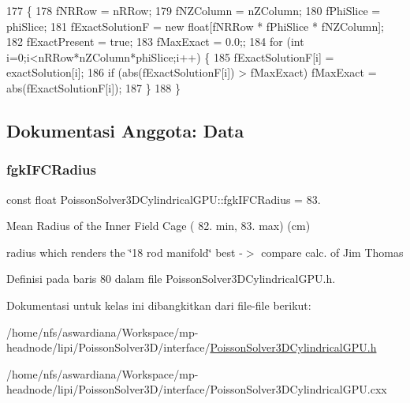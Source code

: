\begin{DoxyCode}
177                                                                                                            
         \{
178     fNRRow = nRRow;
179     fNZColumn = nZColumn;
180     fPhiSlice = phiSlice;
181     fExactSolutionF = \textcolor{keyword}{new} \textcolor{keywordtype}{float}[fNRRow * fPhiSlice * fNZColumn];
182     fExactPresent = \textcolor{keyword}{true};
183     fMaxExact = 0.0;;
184     \textcolor{keywordflow}{for} (\textcolor{keywordtype}{int} i=0;i<nRRow*nZColumn*phiSlice;i++) \{
185         fExactSolutionF[i] = exactSolution[i];
186         \textcolor{keywordflow}{if} (abs(fExactSolutionF[i]) > fMaxExact) fMaxExact = abs(fExactSolutionF[i]); 
187     \}
188 \}
\end{DoxyCode}


\subsection{Dokumentasi Anggota\+: Data}
\hypertarget{classPoissonSolver3DCylindricalGPU_a6688ba03a837d4919001cd0aa14ef80e}{}\label{classPoissonSolver3DCylindricalGPU_a6688ba03a837d4919001cd0aa14ef80e} 
\subsubsection{\texorpdfstring{fgk\+I\+F\+C\+Radius}{fgkIFCRadius}}
{\footnotesize\ttfamily const float Poisson\+Solver3\+D\+Cylindrical\+G\+P\+U\+::fgk\+I\+F\+C\+Radius = 83.\hspace{0.3cm}{\ttfamily [static]}}



Mean Radius of the Inner Field Cage ( 82. min, 83. max) (cm) 

radius which renders the \char`\"{}18 rod manifold\char`\"{} best -\/$>$ compare calc. of Jim Thomas 

Definisi pada baris 80 dalam file Poisson\+Solver3\+D\+Cylindrical\+G\+P\+U.\+h.



Dokumentasi untuk kelas ini dibangkitkan dari file-\/file berikut\+:\begin{DoxyCompactItemize}
\item 
/home/nfs/aswardiana/\+Workspace/mp-\/headnode/lipi/\+Poisson\+Solver3\+D/interface/\hyperlink{PoissonSolver3DCylindricalGPU_8h}{Poisson\+Solver3\+D\+Cylindrical\+G\+P\+U.\+h}\item 
/home/nfs/aswardiana/\+Workspace/mp-\/headnode/lipi/\+Poisson\+Solver3\+D/interface/Poisson\+Solver3\+D\+Cylindrical\+G\+P\+U.\+cxx\end{DoxyCompactItemize}
